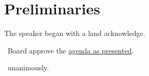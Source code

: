 \section*{Preliminaries}

\begin{information}

    The speaker began with a land acknowledge. 

\end{information}

\begin{motion}
    \birt\ Board approve the \hyperref[agenda]{agenda as presented}.
    \movers{\seneca}{\nickta}

    \carries\ unanimously.
\end{motion}
